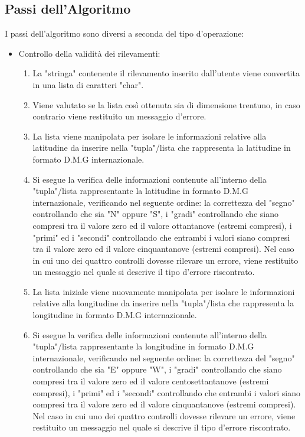 \documentclass{article}
\begin{document}
\subsection{Passi dell'Algoritmo}
I passi dell'algoritmo sono diversi a seconda del tipo d'operazione:
\begin{itemize}
	
	\item Controllo della validità dei rilevamenti:
	\begin{enumerate}
		\item La "stringa" contenente il rilevamento inserito dall'utente viene convertita in una lista di caratteri "char".
		\item Viene valutato se la lista così ottenuta sia di dimensione trentuno, in caso contrario viene restituito un messaggio d'errore.
		\item La lista viene manipolata per isolare le informazioni relative alla latitudine da inserire nella "tupla"/lista che rappresenta la latitudine in formato D.M.G internazionale.
		\item Si esegue la verifica delle informazioni contenute all'interno della "tupla"/lista rappresentante la latitudine in formato D.M.G internazionale, verificando nel seguente ordine:  la correttezza del "segno" controllando che sia "N" oppure "S", i "gradi" controllando che siano compresi tra il valore zero ed il valore ottantanove (estremi compresi), i "primi" ed i "secondi" controllando che entrambi i valori siano compresi tra il valore zero ed il valore cinquantanove (estremi compresi). Nel caso in cui uno dei quattro controlli dovesse rilevare un errore, viene restituito un messaggio nel quale si descrive il tipo d'errore riscontrato.
		\item La lista iniziale viene nuovamente manipolata per isolare le informazioni relative alla longitudine da inserire nella "tupla"/lista che rappresenta la longitudine in formato D.M.G internazionale.
		\item Si esegue la verifica delle informazioni contenute all'interno della "tupla"/lista rappresentante la longitudine in formato D.M.G internazionale, verificando nel seguente ordine:  la correttezza del "segno" controllando che sia "E" oppure "W", i "gradi" controllando che siano compresi tra il valore zero ed il valore centosettantanove (estremi compresi), i "primi" ed i "secondi" controllando che entrambi i valori siano compresi tra il valore zero ed il valore cinquantanove (estremi compresi). Nel caso in cui uno dei quattro controlli dovesse rilevare un errore, viene restituito un messaggio nel quale si descrive il tipo d'errore riscontrato.
	\end{enumerate}


\end{itemize}
\end{document}
